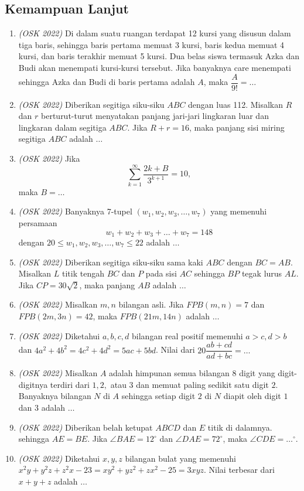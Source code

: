 \subsection{Kemampuan Lanjut}
\begin{enumerate}
	\item \textit{(OSK 2022)} Di dalam suatu ruangan terdapat 12 kursi yang disusun dalam tiga baris, sehingga baris pertama memuat 3 kursi, baris kedua memuat 4 kursi, dan baris terakhir memuat 5 kursi. Dua belas siswa termasuk Azka dan Budi akan menempati kursi-kursi tersebut. Jika banyaknya care menempati sehingga Azka dan Budi di baris pertama adalah $A$, maka $\dfrac{A}{9!}=\dots$
	
	\item \textit{(OSK 2022)} Diberikan segitiga siku-siku $ABC$ dengan luas 112. Misalkan $R$ dan $r$ berturut-turut menyatakan panjang jari-jari lingkaran luar dan lingkaran dalam segitiga $ABC$. Jika  $R+r = 16$, maka panjang sisi miring segitiga $ABC$ adalah $\dots$
	
	\item \textit{(OSK 2022)} Jika
	\[
	\sum_{k=1}^\infty \frac{2k+B}{3^{k+1}} = 10,
	\]
	maka $B = \dots$
	
	\item \textit{(OSK 2022)} Banyaknya 7-tupel $(w_1,w_2,w_3,\dots,w_7)$ yang memenuhi persamaan $$w_1+w_2+w_3+\dots +w_7=148$$ dengan $20\leq w_1,w_2,w_3,\dots,w_7\leq 22$ adalah $\dots$
	
	\item \textit{(OSK 2022)} Diberikan segitiga siku-siku sama kaki $ABC$ dengan $BC = AB$. Misalkan $L$ titik tengah $BC$ dan $P$ pada sisi $AC$ sehingga $BP$ tegak lurus $AL$. Jika $CP = 30\sqrt{2}$, maka panjang $AB$ adalah $\dots$
	
	\item \textit{(OSK 2022)}  Misalkan $m,n$ bilangan asli. Jika $FPB(m,n) = 7$ dan $FPB(2m,3n) = 42$, maka $FPB(21m,14n)$ adalah $\dots$
	
	\item \textit{(OSK 2022)} Diketahui $a,b,c,d$ bilangan real positif memenuhi $a > c,d >b$ dan $4a^2+4b^2 = 4c^2+4d^2 = 5ac+5bd$. Nilai dari $20\dfrac{ab+cd}{ad+bc} = \dots$
	
	\item \textit{(OSK 2022)} Misalkan $A$ adalah himpunan semua bilangan 8 digit yang digit-digitnya terdiri dari $1, 2,$ atau $3$ dan memuat paling sedikit satu digit $2$. Banyaknya bilangan $N$ di $A$ sehingga setiap digit $2$ di $N$ diapit oleh digit $1$ dan $3$ adalah $\dots$
	
	\item \textit{(OSK 2022)} Diberikan belah ketupat $ABCD$ dan $E$ titik di dalamnya. sehingga $AE = BE$. Jika $\angle BAE = 12^\circ$ dan $\angle DAE = 72^\circ$, maka $\angle CDE = \dots^\circ$.
	
	\item \textit{(OSK 2022)} Diketahui $x,y,z$ bilangan bulat yang memenuhi $x^2y+y^2z+z^2x-23 = xy^2+yz^2+zx^2-25 = 3xyz$. Nilai terbesar dari $x+y+z$ adalah $\dots$
\end{enumerate}
\newpage

